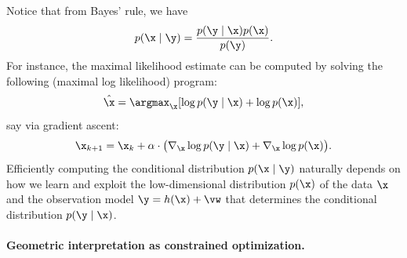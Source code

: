 \documentclass[../../book-main.tex]{subfiles}
\begin{document}
Notice that from Bayes' rule, we have
\begin{equation}
  p(\x\mid \y) = \frac{p(\y\mid \x) p(\x) }{p(\y)}.
\end{equation} 
For instance, the maximal likelihood estimate can be computed by solving the following (maximal log likelihood) program:
\begin{equation}
    \hat{\x} = \argmax_{\x} [\log p(\y\mid \x) + \log p(\x)], 
\end{equation}
say via gradient ascent:
\begin{equation}
    \x_{k+1} = \x_k + \alpha \cdot \big(\nabla_{\x} \log p(\y \mid \x) + \nabla_{\x} \log p(\x)\big).
    \label{eqn:loglikelihoo-gradient-ascent}
\end{equation}
Efficiently computing the conditional distribution $p(\x \mid \y)$ naturally depends on how we learn and exploit the low-dimensional distribution $p(\x)$ of the data $\x$ and the observation model $\y = h(\x) + \vw$ that determines the conditional distribution $p(\y \mid \x)$. 

\paragraph{Geometric interpretation as constrained optimization.}
\end{document}

